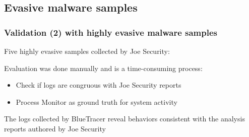 \documentclass[compress]{beamer}
\begin{document}
\subsection{Evasive malware samples}
\begin{frame}
    \frametitle{Validation (2) with highly evasive malware samples}
    
	Five highly evasive samples collected by Joe Security:    
    
    \begin{table}[h]
\vspace*{-0.1cm}
\begin{center}
\end{center}
\end{table}
\vspace{-0.1cm}
Evaluation was done manually and is a time-consuming process:
\begin{itemize}
\item Check if logs are congruous with Joe Security reports
\item Process Monitor as ground truth for system activity
\end{itemize}
\medskip
\begin{beamerboxesrounded}[shadow=true]{}
The
logs collected by BlueTracer reveal behaviors consistent with the analysis reports
authored by Joe Security
\end{beamerboxesrounded}	

\end{frame}
\end{document}
